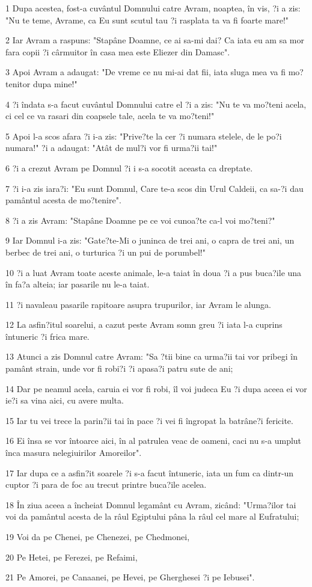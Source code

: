 \par 1 Dupa acestea, fost-a cuvântul Domnului catre Avram, noaptea, în vis, ?i a zis: "Nu te teme, Avrame, ca Eu sunt scutul tau ?i rasplata ta va fi foarte mare!"
\par 2 Iar Avram a raspuns: "Stapâne Doamne, ce ai sa-mi dai? Ca iata eu am sa mor fara copii ?i cârmuitor în casa mea este Eliezer din Damasc".
\par 3 Apoi Avram a adaugat: "De vreme ce nu mi-ai dat fii, iata sluga mea va fi mo?tenitor dupa mine!"
\par 4 ?i îndata s-a facut cuvântul Domnului catre el ?i a zis: "Nu te va mo?teni acela, ci cel ce va rasari din coapsele tale, acela te va mo?teni!"
\par 5 Apoi l-a scos afara ?i i-a zis: "Prive?te la cer ?i numara stelele, de le po?i numara!" ?i a adaugat: "Atât de mul?i vor fi urma?ii tai!"
\par 6 ?i a crezut Avram pe Domnul ?i i s-a socotit aceasta ca dreptate.
\par 7 ?i i-a zis iara?i: "Eu sunt Domnul, Care te-a scos din Urul Caldeii, ca sa-?i dau pamântul acesta de mo?tenire".
\par 8 ?i a zis Avram: "Stapâne Doamne pe ce voi cunoa?te ca-l voi mo?teni?"
\par 9 Iar Domnul i-a zis: "Gate?te-Mi o juninca de trei ani, o capra de trei ani, un berbec de trei ani, o turturica ?i un pui de porumbel!"
\par 10 ?i a luat Avram toate aceste animale, le-a taiat în doua ?i a pus buca?ile una în fa?a alteia; iar pasarile nu le-a taiat.
\par 11 ?i navaleau pasarile rapitoare asupra trupurilor, iar Avram le alunga.
\par 12 La asfin?itul soarelui, a cazut peste Avram somn greu ?i iata l-a cuprins întuneric ?i frica mare.
\par 13 Atunci a zis Domnul catre Avram: "Sa ?tii bine ca urma?ii tai vor pribegi în pamânt strain, unde vor fi robi?i ?i apasa?i patru sute de ani;
\par 14 Dar pe neamul acela, caruia ei vor fi robi, îl voi judeca Eu ?i dupa aceea ei vor ie?i sa vina aici, cu avere multa.
\par 15 Iar tu vei trece la parin?ii tai în pace ?i vei fi îngropat la batrâne?i fericite.
\par 16 Ei însa se vor întoarce aici, în al patrulea veac de oameni, caci nu s-a umplut înca masura nelegiuirilor Amoreilor".
\par 17 Iar dupa ce a asfin?it soarele ?i s-a facut întuneric, iata un fum ca dintr-un cuptor ?i para de foc au trecut printre buca?ile acelea.
\par 18 În ziua aceea a încheiat Domnul legamânt cu Avram, zicând: "Urma?ilor tai voi da pamântul acesta de la râul Egiptului pâna la râul cel mare al Eufratului;
\par 19 Voi da pe Chenei, pe Chenezei, pe Chedmonei,
\par 20 Pe Hetei, pe Ferezei, pe Refaimi,
\par 21 Pe Amorei, pe Canaanei, pe Hevei, pe Gherghesei ?i pe Iebusei".

